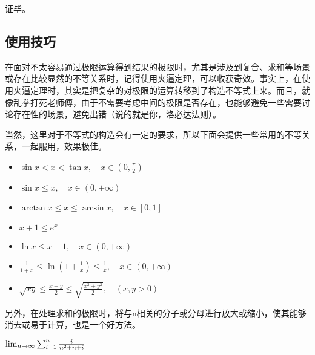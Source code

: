 证毕。

\subsection{使用技巧}

在面对不太容易通过极限运算得到结果的极限时，尤其是涉及到复合、求和等场景或存在比较显然的不等关系时，记得使用夹逼定理，可以收获奇效。事实上，在使用夹逼定理时，其实是把复杂的对极限的运算转移到了构造不等式上来。而且，就像乱拳打死老师傅，由于不需要考虑中间的极限是否存在，也能够避免一些需要讨论存在性的场景，避免出错（说的就是你，洛必达法则）。

当然，这里对于不等式的构造会有一定的要求，所以下面会提供一些常用的不等关系，一起服用，效果极佳。

\begin{itemize}
\item $\sin x < x < \tan x, \quad x \in \left(0, \frac{\pi}{2}\right)$
\item $\sin x \leq x, \quad x \in (0, +\infty)$
\item $\arctan x \leq x \leq \arcsin x, \quad x \in [0, 1] $
\item $x + 1\leq e^x$
\item $\ln x\leq x - 1 , \quad x \in (0, +\infty)$
\item $\frac{1}{1 + x} \leq \ln\left(1 + \frac{1}{x}\right) \leq \frac{1}{x}, \quad x \in (0, +\infty)$
\item $\sqrt{xy} \leq \frac{x + y}{2} \leq \sqrt{\frac{x^2 + y^2}{2}}, \quad (x, y > 0)$
\end{itemize}

\begin{example}{}

\end{example}
另外，在处理求和的极限时，将与n相关的分子或分母进行放大或缩小，使其能够消去或易于计算，也是一个好方法。
\begin{example}{$\lim_{n\to \infty}\sum_{i=1}^n{i\over n^2+n+i}$}
\end{example}